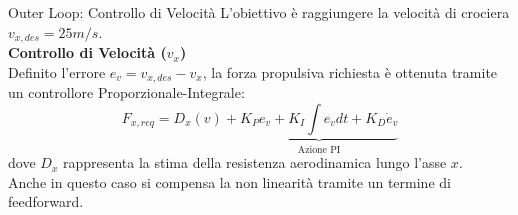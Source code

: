 \documentclass[aspectratio=169]{beamer} %
\begin{document}






\begin{frame}{Outer Loop: Controllo di Velocità}
    L'obiettivo è raggiungere la velocità di crociera $v_{x,des} = 25 m/s$.\\
    \vspace{0.2cm}
    \textbf{Controllo di Velocità ($v_x$)} \\
    Definito l'errore $e_{v} = v_{x,des} - v_x$, la forza propulsiva richiesta è ottenuta tramite un controllore Proporzionale-Integrale:
    \begin{equation}
        F_{x,req} = D_{x}(v) + \underbrace{K_P e_v + K_I \int e_v dt + K_D \dot{e}_v}_{\text{Azione PI}}
        \label{eq:fx}
    \end{equation}
    dove $D_{x}$ rappresenta la stima della resistenza aerodinamica lungo l'asse $x$.\\
    Anche in questo caso si compensa la non linearità tramite un termine di feedforward.
\end{frame}
\end{document}
